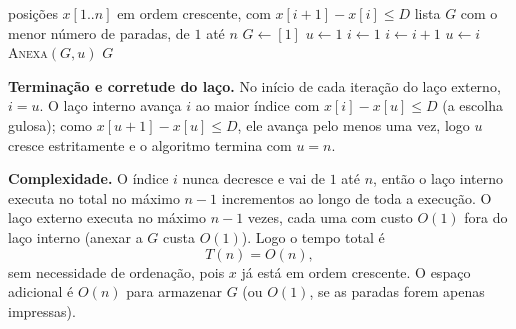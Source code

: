 \documentclass[11pt,a4paper]{article}
\begin{document}
\begin{algorithm}[H]
\caption{\textsc{Paradas-Hotéis}$(x, n, D)$}
\begin{algorithmic}[1]
\Require posições $x[1..n]$ em ordem crescente, com $x[i+1]-x[i]\le D$
\Ensure lista $G$ com o menor número de paradas, de $1$ até $n$
\State $G \gets [1]$
\State $u \gets 1$ 
\State $i \gets 1$ 
    \State $i \gets i + 1$ 
  \EndWhile
  \State $u \gets i$ 
  \State \textsc{Anexa}$(G, u)$
\EndWhile
\State \Return $G$
\end{algorithmic}
\end{algorithm}

\noindent\textbf{Terminação e corretude do laço.} No início de cada iteração do
laço externo, $i = u$. O laço interno avança $i$ ao maior índice com
$x[i]-x[u]\le D$ (a escolha gulosa); como $x[u+1]-x[u]\le D$, ele avança pelo menos
uma vez, logo $u$ cresce estritamente e o algoritmo termina com $u=n$.

\noindent\textbf{Complexidade.} O índice $i$ nunca decresce e vai de $1$ até $n$,
então o laço interno executa no total no máximo $n-1$ incrementos ao longo de toda
a execução. O laço externo executa no máximo $n-1$ vezes, cada uma com custo
$O(1)$ fora do laço interno (anexar a $G$ custa $O(1)$). Logo o tempo total é
\[ T(n) = O(n), \]
sem necessidade de ordenação, pois $x$ já está em ordem crescente. O espaço adicional
é $O(n)$ para armazenar $G$ (ou $O(1)$, se as paradas forem apenas impressas).
\end{document}
